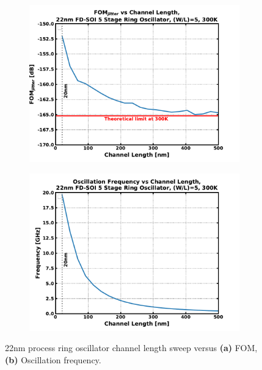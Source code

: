 		\begin{figure}[htb!]
		    \centering
		    \begin{subfigure}{0.5\textwidth}
		        \centering
		        \includegraphics[width=1\textwidth, angle=0]{./figs/design/22fdx_rosc_fom_}
		        \caption{ }
		        \label{fig:rosc_fom}
		    \end{subfigure}%
		    \begin{subfigure}{0.5\textwidth}
		        \centering
		        \includegraphics[width=1\textwidth, angle=0]{./figs/design/22fdx_rosc_freq}
		        \caption{ }
		        \label{fig:rosc_freq}
		    \end{subfigure}
		    \label{fig:rosc_groupa}
		    \caption{22nm process ring oscillator channel length sweep versus \textbf{(a)} FOM, \textbf{(b)} Oscillation frequency.}
		\end{figure} 	

